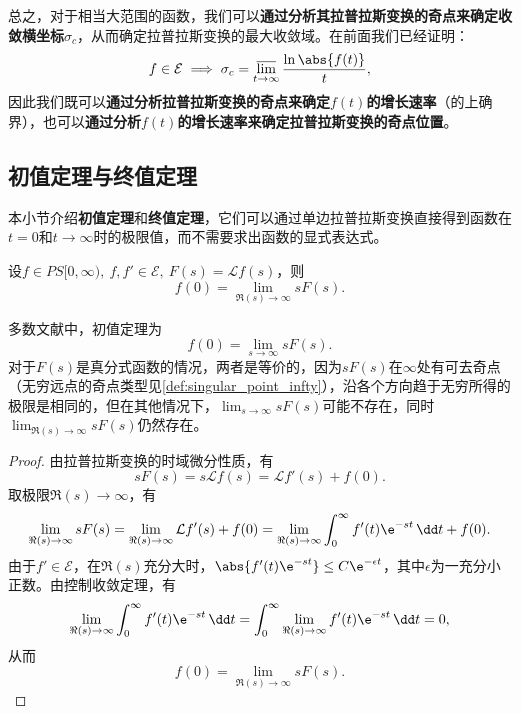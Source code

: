 总之，对于相当大范围的函数，我们可以\textbf{通过分析其拉普拉斯变换的奇点来确定收敛横坐标}$\sigma_c$，从而确定拉普拉斯变换的最大收敛域。在前面我们已经证明：
\begin{equation}
    f\in\mathcal{E}\implies\sigma_c=\varlimsup_{t\to\infty}\frac{\ln\abs{f(t)}}{t},
\end{equation}
因此我们既可以\textbf{通过分析拉普拉斯变换的奇点来确定$f(t)$的增长速率}（的上确界），也可以\textbf{通过分析$f(t)$的增长速率来确定拉普拉斯变换的奇点位置}。

\subsection{初值定理与终值定理}\label{sub:initial_and_final_value}
本小节介绍\textbf{初值定理}和\textbf{终值定理}，它们可以通过单边拉普拉斯变换直接得到函数在$t=0$和$t\to\infty$时的极限值，而不需要求出函数的显式表达式。
\begin{theorem}[初值定理]
    \label{thm:initial_value}
    设$f\in PS[0,\infty),\ f,f'\in\mathcal{E},\ F(s)=\mathcal{L}f(s)$，则
    \begin{equation}
        f(0)=\lim_{\Re(s)\to\infty}sF(s).
    \end{equation}
\end{theorem}
\begin{remark}
    多数文献中，初值定理为
    \begin{equation}
        f(0)=\lim_{s\to\infty}sF(s).
    \end{equation}
    对于$F(s)$是真分式函数的情况，两者是等价的，因为$sF(s)$在$\infty$处有可去奇点（无穷远点的奇点类型见\cref{def:singular_point_infty}），沿各个方向趋于无穷所得的极限是相同的，但在其他情况下，$\lim_{s\to\infty}sF(s)$可能不存在，同时$\lim_{\Re(s)\to\infty}sF(s)$仍然存在。
\end{remark}
\begin{proof}
    由拉普拉斯变换的时域微分性质，有
    \begin{equation}
        sF(s)=s\mathcal{L}f(s)=\mathcal{L}f'(s)+f(0).
    \end{equation}
    取极限$\Re(s)\to\infty$，有
    \begin{equation}
        \lim_{\Re(s)\to\infty}sF(s)=\lim_{\Re(s)\to\infty}\mathcal{L}f'(s)+f(0)=\lim_{\Re(s)\to\infty}\int_{0}^{\infty}f'(t)\e^{-st}\,\dd t+f(0).
    \end{equation}
    由于$f'\in\mathcal{E}$，在$\Re(s)$充分大时，$\abs{f'(t)\e^{-st}}\leq C\e^{-\epsilon t}$，其中$\epsilon$为一充分小正数。由控制收敛定理，有
    \begin{equation}
        \lim_{\Re(s)\to\infty}\int_{0}^{\infty}f'(t)\e^{-st}\,\dd t=\int_{0}^{\infty}\lim_{\Re(s)\to\infty}f'(t)\e^{-st}\,\dd t=0,
    \end{equation}
    从而
    \begin{equation}
        f(0)=\lim_{\Re(s)\to\infty}sF(s).
    \end{equation}
\end{proof}

